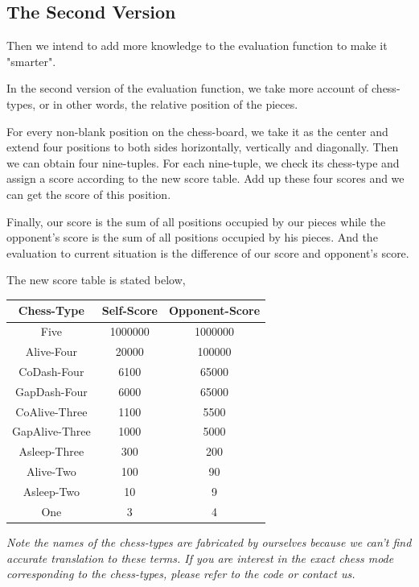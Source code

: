 \documentclass[11pt,a4paper]{article}
\begin{document}
\subsection{The Second Version}
Then we intend to add more knowledge to the evaluation function to make it "smarter".

In the second version of the evaluation function, we take more account of chess-types, or in other words, the relative position of the pieces.

For every non-blank position on the chess-board, we take it as the center and extend four positions to both sides horizontally, vertically and diagonally. Then we can obtain four nine-tuples. For each nine-tuple, we check its chess-type and assign a score according to the new score table. Add up these four scores and we can get the score of this position.

Finally, our score is the sum of all positions occupied by our pieces while the opponent's score is the sum of all positions occupied by his pieces. And the evaluation to current situation is the difference of our score and opponent's score.

The new score table is stated below,
\begin{table}[h]
\centering
\begin{tabular}{c|c|c}
\hline
Chess-Type&Self-Score&Opponent-Score  \\
\hline
Five&1000000&1000000\\
Alive-Four&20000&100000\\
CoDash-Four&6100&65000\\
GapDash-Four&6000&65000\\
CoAlive-Three&1100&5500\\
GapAlive-Three&1000&5000\\
Asleep-Three&300&200\\
Alive-Two&100&90\\
Asleep-Two&10&9\\
One&3&4\\
\hline
\end{tabular}
\end{table}

\noindent\begin{small}\emph{Note the names of the chess-types are fabricated by ourselves because we can't find accurate translation to these terms. If you are interest in the exact chess mode corresponding to the chess-types, please refer to the code or contact us.}\end{small}
\end{document}
